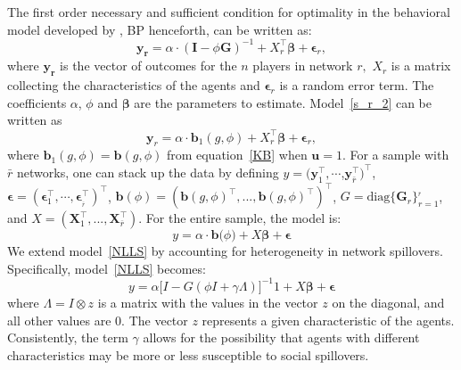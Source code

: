 \documentclass[nojss]{jss}
\begin{document}
	The first order necessary and sufficient condition for optimality in the behavioral model developed by \cite{Battaglini+Patacchini:2018}, BP henceforth, can be written as:
	\begin{equation}
	\mathbf{y}_{\mathbf{r}}=\alpha \cdot \left( \boldsymbol{I}-\phi \boldsymbol{G%
	}\right) ^{-1}+X_{r}^\top\mathbf{\beta }+\mathbf{\epsilon }_{r},
	\label{s_r_2}
	\end{equation}
	where $\mathbf{y}_{\mathbf{r}}$ is the vector of outcomes for the $n$ players in network $r\mathbf{,}$ $X_{r}$ is a matrix collecting the characteristics of the agents and $\mathbf{\epsilon }_{r}$ is a random error term. The coefficients $\alpha $, $\phi $ and $\mathbf{\beta }$ are the parameters to estimate. Model~\ref{s_r_2} can be written as
	\begin{equation}
	\mathbf{y}_{r}=\alpha \cdot \boldsymbol{b}_{1}\left( g,\phi \right)
	+X_{r}^\top\mathbf{\beta }+\mathbf{\epsilon }_{r},
	\end{equation}%
	where $\boldsymbol{b}_{1}\left(g,\phi \right) =\boldsymbol{b}\left(g,\phi
	\right) $ from equation~\ref{KB} when $\boldsymbol{u}=1$.\newline
	For a sample with $\bar{r}$ networks, one can stack up the data by defining $y=(\mathbf{y}_{1}^\top,\cdots$,$\mathbf{y}_{\bar{r}}^\top)^\top$, $\mathbf{\epsilon }=(\boldsymbol{\epsilon }_{1}^\top,\cdots ,\boldsymbol{\epsilon }_{_{\bar{r}}}^\top)^\top$, $\mathbf{b}(\phi)=\left(\boldsymbol{b}\left(g,\phi \right)^\top,...,\boldsymbol{b}\left(g,\phi\right)^\top\right) ^\top$, $G=\mathrm{diag}\{\boldsymbol{G}_{r}\}_{r=1}^{_{\bar{r}}}$, and $X=(\boldsymbol{X}_{1}^\top,...,\boldsymbol{X}_{\overline{r}}^\top)$. For the entire sample, the model is: 
	\begin{equation}
	y=\alpha \cdot \mathbf{b(}\phi \mathbf{)}+X\mathbf{\beta}+\mathbf{\epsilon }  \label{NLLS}
	\end{equation}
	We extend model~\ref{NLLS} by accounting for heterogeneity in network spillovers. Specifically, model~\ref{NLLS} becomes:
	\begin{equation}
	y=\alpha \lbrack I-G(\phi I+\gamma \Lambda )]^{-1}1+X\mathbf{\beta }+\mathbf{\epsilon }  
	\label{BP_2}
	\end{equation}
	where $\Lambda =I\otimes z$ is a matrix with the values in the vector $z$ on the diagonal, and all other values are 0. The vector $z$ represents a given characteristic of the agents. Consistently, the term $\gamma$ allows for the possibility that agents with different characteristics may be more or less susceptible to social spillovers.
	
\end{document}
